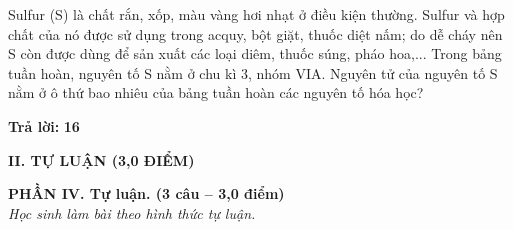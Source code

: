 \documentclass[11pt,a4paper]{article}
\begin{document}
\begin{ex}
Sulfur (S) là chất rắn, xốp, màu vàng hơi nhạt ở điều kiện thường. Sulfur và hợp chất của nó được sử dụng trong acquy, bột giặt, thuốc diệt nấm; do dễ cháy nên S còn được dùng để sản xuất các loại diêm, thuốc súng, pháo hoa,... Trong bảng tuần hoàn, nguyên tố S nằm ở chu kì 3, nhóm VIA. Nguyên tử của nguyên tố S nằm ở ô thứ bao nhiêu của bảng tuần hoàn các nguyên tố hóa học?

\vspace{2pt}
\textbf{Trả lời:} \textbf{\color{hfRed}16}
\end{ex}

\vspace{4pt}
\noindent
{\color{mainGreen}\textbf{\Large II. TỰ LUẬN (3,0 ĐIỂM)}}

\vspace{3pt}
\noindent
{\color{mainGreen}\textbf{\large PHẦN IV. Tự luận. (3 câu -- 3,0 điểm)}}\\
\textit{\small Học sinh làm bài theo hình thức tự luận.}
\vspace{2pt}
\end{document}
